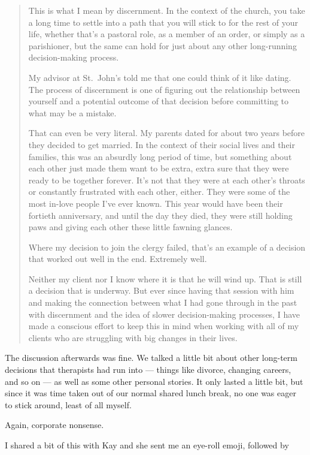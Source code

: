 \begin{quote}
This is what I mean by discernment. In the context of the church, you take a long time to settle into a path that you will stick to for the rest of your life, whether that's a pastoral role, as a member of an order, or simply as a parishioner, but the same can hold for just about any other long-running decision-making process.

My advisor at St.~John's told me that one could think of it like dating. The process of discernment is one of figuring out the relationship between yourself and a potential outcome of that decision before committing to what may be a mistake.

That can even be very literal. My parents dated for about two years before they decided to get married. In the context of their social lives and their families, this was an absurdly long period of time, but something about each other just made them want to be extra, extra sure that they were ready to be together forever. It's not that they were at each other's throats or constantly frustrated with each other, either. They were some of the most in-love people I've ever known. This year would have been their fortieth anniversary, and until the day they died, they were still holding paws and giving each other these little fawning glances.

Where my decision to join the clergy failed, that's an example of a decision that worked out well in the end. Extremely well.

Neither my client nor I know where it is that he will wind up. That is still a decision that is underway. But ever since having that session with him and making the connection between what I had gone through in the past with discernment and the idea of slower decision-making processes, I have made a conscious effort to keep this in mind when working with all of my clients who are struggling with big changes in their lives.
\end{quote}

The discussion afterwards was fine. We talked a little bit about other long-term decisions that therapists had run into --- things like divorce, changing careers, and so on --- as well as some other personal stories. It only lasted a little bit, but since it was time taken out of our normal shared lunch break, no one was eager to stick around, least of all myself.

Again, corporate nonsense.

I shared a bit of this with Kay and she sent me an eye-roll emoji, followed by

